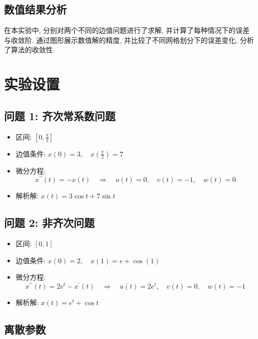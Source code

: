 \documentclass[11pt]{article}
\begin{document}
\subsection{数值结果分析}

在本实验中, 分别对两个不同的边值问题进行了求解, 并计算了每种情况下的误差与收敛阶. 通过图形展示数值解的精度, 并比较了不同网格划分下的误差变化, 分析了算法的收敛性. 

\section{实验设置}

\subsection{问题 1: 齐次常系数问题}

\begin{itemize}
	\item 区间: $[0, \frac{\pi}{2}]$
	\item 边值条件: $x(0) = 3,\quad x(\frac{\pi}{2}) = 7$
	\item 微分方程:
	\begin{equation*}
	x^{\prime\prime}(t) = -x(t) \quad \Rightarrow \quad
	u(t) = 0,\quad v(t) = -1,\quad w(t) = 0
	\end{equation*}
	\item 解析解: $x(t) = 3\cos t + 7\sin t$
\end{itemize}

\subsection{问题 2: 非齐次问题}

\begin{itemize}
	\item 区间: $[0, 1]$
	\item 边值条件: $x(0) = 2,\quad x(1) = e + \cos(1)$
	\item 微分方程:
	\begin{equation*}
	x^{\prime\prime}(t) = 2e^t - x^{\prime}(t) \quad \Rightarrow \quad
	u(t) = 2e^t,\quad v(t) = 0,\quad w(t) = -1
	\end{equation*}
	\item 解析解: $x(t) = e^t + \cos t$
\end{itemize}

\subsection{离散参数}
\end{document}
